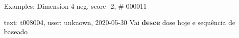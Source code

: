\begin{frame}{Examples: Dimension 4 neg, score -2, \# 000011}
\footnotesize
\begin{alertblock}{text: t008004, user: unknown, 2020-05-30}
Vai \textbf{desce} dose hoje e sequência de baseado  
   
\textbf{} \textbf{} 
\textbf{} \textbf{} 
\textbf{} 
\end{alertblock}
\end{frame}
